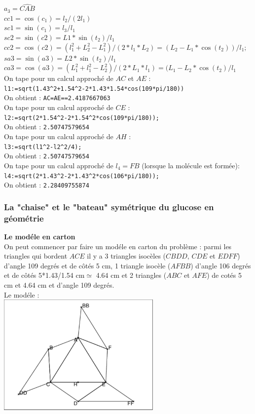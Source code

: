 \documentclass[a4paper,11pt]{book}
\begin{document}
$a_3=\widehat{CAB}$ \\
$cc1=\cos(c_1)=l_2/(2l_1)$\\
$sc1=\sin(c_1)=l_3/l_1$\\
$sc2=\sin(c2)=L1*\sin(t_2)/l_1$\\
$cc2=\cos(c2)=(l_1^2+L_2^2-L_1^2)/(2*l_1*L_2)=(L_2-L_1*\cos(t_2))/l_1;$\\
$sa3=\sin(a3)=L2*\sin(t_2)/l_1$\\
$ca3=\cos(a3)=(L_1^2+l_1^2-L_2^2)/(2*L_1*l_1)=(L_1-L_2*\cos(t_2)/l_1$\\
On tape pour un calcul approch\'e de $AC$ et $AE$ :\\
{\tt l1:=sqrt(1.43\verb|^|2+1.54\verb|^|2-2*1.43*1.54*cos(109*pi/180))}\\
On obtient : {\tt AC=AE==2.4187667063}\\
On tape pour un calcul approch\'e de $CE$ :\\
{\tt l2:=sqrt(2*1.54\verb|^|2-2*1.54\verb|^|2*cos(109*pi/180));}\\
On obtient : {\tt 2.50747579654}\\
On tape pour un calcul approch\'e de $AH$ :\\
{\tt l3:=sqrt(l1\verb|^|2-l2\verb|^|2/4);}\\
On obtient : {\tt 2.50747579654}\\
On tape pour un calcul approch\'e de $l_4=FB$ (lorsque la mol\'ecule est 
form\'ee):\\
{\tt l4:=sqrt(2*1.43\verb|^|2-2*1.43\verb|^|2*cos(106*pi/180));}\\
On obtient : {\tt 2.28409755874}

\subsubsection{La "chaise" et le "bateau" sym\'etrique du glucose en g\'eom\'etrie}
{\bf Le mod\'ele en carton}\\
On peut commencer par faire un mod\'ele en carton du probl\`eme : parmi les 
triangles qui bordent $ACE$ il y a 3 triangles isoc\`eles ($CBDD$, $CDE$ et 
$EDFF$) d'angle 109 degr\'es et de c\^ot\'es 5 cm, 1 triangle isoc\`ele 
($AFBB$) d'angle 106 degr\'es et de c\^ot\'es 5*1.43/1.54 cm$\simeq$ 4.64 cm 
et 2 triangles ($ABC$ et $AFE$) de cot\'es 5 cm et 4.64 cm et d'angle 
109 degr\'es. \\
Le mod\'ele :\\
 \includegraphics[width=8cm]{glucose1}\\
\end{document}
